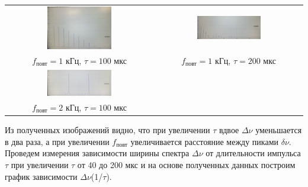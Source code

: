 \documentclass[a4paper,12pt]{article} %
\begin{document}
\hfill \break \begin{center}
\begin{tabular}{cc}
\includegraphics[width=0.45\textwidth]{6.jpg}&\includegraphics[width=0.45\textwidth]{7.jpg}\\
$f_{\text{повт}} = 1$ кГц, $\tau = 100$ мкс&$f_{\text{повт}} = 1$ кГц, $\tau = 200$ мкс\\
\includegraphics[width=0.45\textwidth]{8.jpg}\\
$f_{\text{повт}} = 2$ кГц, $\tau = 100$ мкс\\
\end{tabular}
\end{center}

\hfill \break Из полученных изображений видно, что при увеличении $\tau$ вдвое $\Delta \nu$ уменьшается в два раза, а при увеличении $f_\text{повт}$ увеличивается расстояние между пиками $\delta \nu$. Проведем измерения зависимости ширины спектра $\Delta \nu$ от длительности импульса $\tau$ при увеличении $\tau$ от 40 до 200 мкс и на основе полученных данных построим график зависимости $\Delta \nu$(1/$\tau$).\\
\end{document}
